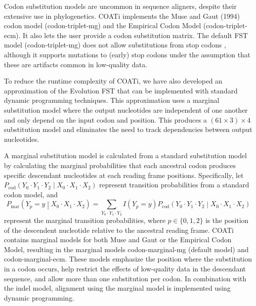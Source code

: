 Codon substitution models are uncommon in sequence aligners, despite their extensive use in phylogenetics.
COATi implements the Muse and Gaut (1994) codon model (codon-triplet-mg) and the Empirical Codon Model \parencite{kosiol_ECM_2007} (codon-triplet-ecm).
It also lets the user provide a codon substitution matrix.
The default FST model (codon-triplet-mg) does not allow substitutions from stop codons , although it supports mutations to (early) stop codons under the assumption that these are artifacts common in low-quality data.

To reduce the runtime complexity of COATi, we have also developed an approximation of the Evolution FST that can be implemented with standard dynamic programming techniques. This approximation uses a marginal substitution model where the output nucleotides are independent of one another and only depend on the input codon and position. This produces a $\left(61 \times 3 \right) \times 4$ substitution model and eliminates the need to track dependencies between output nucleotides.

A marginal substitution model is calculated from a standard substitution model by calculating the marginal probabilities that each ancestral codon produces specific descendant nucleotides at each reading frame positions.
%
Specifically, let
$P_\text{cod}\left(Y_0 \cdot Y_1 \cdot Y_2 \middle| X_0 \cdot X_1 \cdot X_2\right)$ represent transition probabilities from a standard codon model, and
%
\[
P_\text{mar}\left(Y_p = y \middle| X_0 \cdot X_1 \cdot X_2\right) =
\sum_{Y_0 \cdot Y_1 \cdot Y_2} I(Y_p = y) P_\text{cod}\left(Y_0 \cdot Y_1 \cdot Y_2 \middle| X_0 \cdot X_1 \cdot X_2\right)
\]
%
represent the marginal transition probabilities, where
$p \in \{0, 1, 2\}$ is the position of the descendent nucleotide relative to the ancestral reading frame.
COATi contains marginal models for both Muse and Gaut or the Empirical Codon Model, resulting in the marginal models codon-marginal-mg (default model) and codon-marginal-ecm.
These models emphasize the position where the substitution in a codon occurs, help restrict the effects of low-quality data in the descendant sequence, and allow more than one substitution per codon.
In combination with the indel model, alignment using the marginal model is implemented using dynamic programming.

